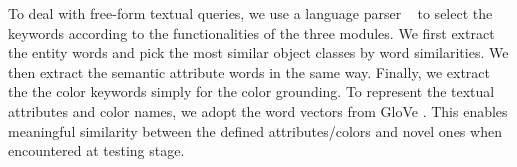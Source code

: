 To deal with free-form textual queries,
we use a language parser ~\citep{bird2009natural} to select the keywords according to the functionalities of the three modules.
We first extract the entity words and pick the most similar object classes by word similarities.
We then extract the semantic attribute words in the same way.
Finally, we extract the the color keywords simply for the color grounding.
To represent the textual attributes and color names,
we adopt the word vectors from GloVe \citep{pennington2014glove}.
This enables meaningful similarity between the defined attributes/colors and
novel ones when encountered at testing stage.




\newcommand\Tstrut{\rule{0pt}{2.2ex}}        
\newcommand\Bstrut{\rule[1.6ex]{0pt}{0pt}} 

